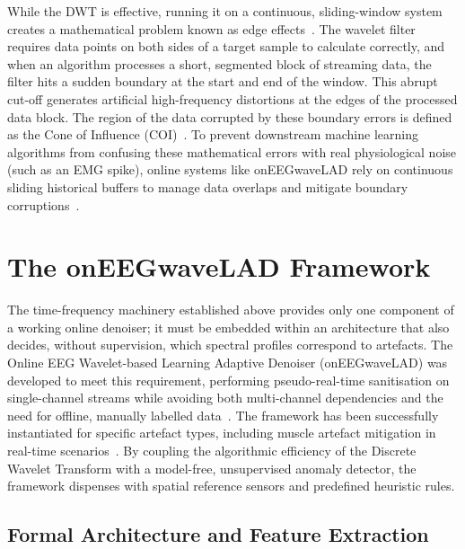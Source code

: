 \documentclass[MScCS,12pt,oneside,final]{uccthesis}
\begin{document}
        While the DWT is effective, running it on a continuous, sliding-window system creates a mathematical problem known as edge effects~\parencite{torrence1998practical}. The wavelet filter requires data points on both sides of a target sample to calculate correctly, and when an algorithm processes a short, segmented block of streaming data, the filter hits a sudden boundary at the start and end of the window. This abrupt cut-off generates artificial high-frequency distortions at the edges of the processed data block. The region of the data corrupted by these boundary errors is defined as the Cone of Influence (COI)~\parencite{torrence1998practical}. To prevent downstream machine learning algorithms from confusing these mathematical errors with real physiological noise (such as an EMG spike), online systems like onEEGwaveLAD rely on continuous sliding historical buffers to manage data overlaps and mitigate boundary corruptions~\parencite{longo2025oneegwavelad}.
        
         \section{The onEEGwaveLAD Framework}
    \label{sec:oneegwavelad_framework}
    
    The time-frequency machinery established above provides only one component of a working online denoiser; it must be embedded within an architecture that also decides, without supervision, which spectral profiles correspond to artefacts. The Online EEG Wavelet-based Learning Adaptive Denoiser (onEEGwaveLAD) was developed to meet this requirement, performing pseudo-real-time sanitisation on single-channel streams while avoiding both multi-channel dependencies and the need for offline, manually labelled data~\parencite{longo2025oneegwavelad, longo2026framework}. The framework has been successfully instantiated for specific artefact types, including muscle artefact mitigation in real-time scenarios~\parencite{longo2025instantiating}. By coupling the algorithmic efficiency of the Discrete Wavelet Transform with a model-free, unsupervised anomaly detector, the framework dispenses with spatial reference sensors and predefined heuristic rules.

        \subsection{Formal Architecture and Feature Extraction}
        \label{subsec:formal_architecture}
        
\end{document}
